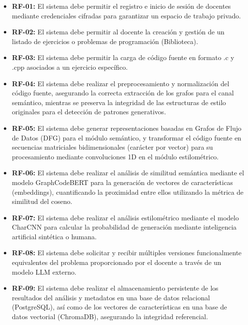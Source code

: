 \begin{itemize}
	\item \textbf{RF-01:} El sistema debe permitir el registro e inicio de sesión de docentes mediante credenciales cifradas para garantizar un espacio de trabajo privado.

	\item \textbf{RF-02:} El sistema debe permitir al docente la creación y gestión de un listado de ejercicios o problemas de programación (Biblioteca).

	\item \textbf{RF-03:} El sistema debe permitir la carga de código fuente en formato .c y .cpp asociados a un ejercicio específico.

	\item \textbf{RF-04:} El sistema debe realizar el preprocesamiento y normalización del código fuente, asegurando la correcta extracción de los grafos para el canal semántico, mientras se preserva la integridad de las estructuras de estilo originales para el detección de patrones generativos.

	\item \textbf{RF-05:} El sistema debe generar representaciones basadas en Grafos de Flujo de Datos (DFG) para el módulo semántico, y transformar el código fuente en secuencias matriciales bidimensionales (carácter por vector) para su procesamiento mediante convoluciones 1D en el módulo estilométrico.

	\item \textbf{RF-06:} El sistema debe realizar el análisis de similitud semántica mediante el modelo GraphCodeBERT para la generación de vectores de características (embeddings), cuantificando la proximidad entre ellos utilizando la métrica de similitud del coseno.

	\item \textbf{RF-07:} El sistema debe realizar el análisis estilométrico mediante el modelo CharCNN para calcular la probabilidad de generación mediante inteligencia artificial sintética o humana.

	\item \textbf{RF-08:} El sistema debe solicitar y recibir múltiples versiones funcionalmente equivalentes del problema proporcionado por el docente a través de un modelo LLM externo.

	\item \textbf{RF-09:} El sistema debe realizar el almacenamiento persistente de los resultados del análisis y metadatos en una base de datos relacional (PostgreSQL), así como de los vectores de características en una base de datos vectorial (ChromaDB), asegurando la integridad referencial.


\end{itemize}
